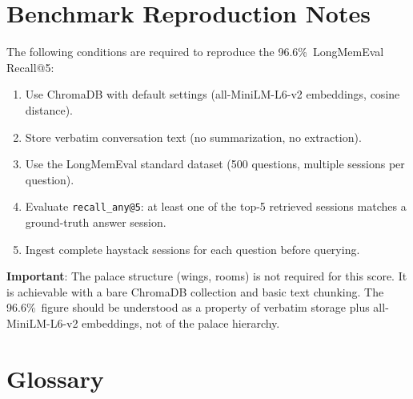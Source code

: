 \documentclass[twoside,11pt]{article}
\begin{document}
\section{Benchmark Reproduction Notes}
\label{app:repro}

The following conditions are required to reproduce the 96.6\%\ LongMemEval
Recall@5:

\begin{enumerate}[leftmargin=*, label=\arabic*.]
\item Use ChromaDB with default settings (all-MiniLM-L6-v2 embeddings,
  cosine distance).
\item Store verbatim conversation text (no summarization, no extraction).
\item Use the LongMemEval standard dataset (500 questions, multiple sessions
  per question).
\item Evaluate \texttt{recall\_any@5}: at least one of the top-5 retrieved
  sessions matches a ground-truth answer session.
\item Ingest complete haystack sessions for each question before querying.
\end{enumerate}

\textbf{Important}: The palace structure (wings, rooms) is not required for
this score.  It is achievable with a bare ChromaDB collection and basic text
chunking.  The 96.6\%\ figure should be understood as a property of verbatim
storage plus all-MiniLM-L6-v2 embeddings, not of the palace hierarchy.

\section{Glossary}
\label{app:glossary}
\end{document}
